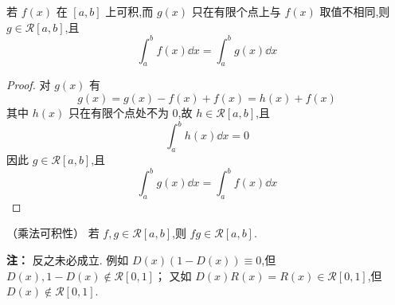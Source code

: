 \begin{corollary}
	若 $f(x)$ 在 $[a,b]$ 上可积,而 $g(x)$ 只在有限个点上与 $f(x)$ 取值不相同,则 $g \in \mathcal{R}[a,b]$,且
	\[
	\int_a^b f(x)\dd x = \int_a^b g(x)\dd x
	\]
\end{corollary}
\begin{proof}
	对 $g(x)$ 有
	\[
	g(x) = g(x) - f(x) + f(x) = h(x) + f(x)
	\]
	其中 $h(x)$ 只在有限个点处不为 $0$,故 $h \in \mathcal{R}[a,b]$,且
	\[
	\int_a^b h(x)\dd x = 0
	\]
	因此 $g \in \mathcal{R}[a,b]$,且
	\[
	\int_a^b g(x)\dd x = \int_a^b f(x)\dd x
	\]
\end{proof}
\begin{proposition}（乘法可积性）
	若 \( f,g \in \mathcal{R}[a,b] \),则 \( fg \in \mathcal{R}[a,b] \).
\end{proposition}
\textbf{注：} 反之未必成立.
例如 \( D(x)(1-D(x)) \equiv 0 \),但 \( D(x), 1-D(x) \notin \mathcal{R}[0,1] \)；
又如 \( D(x)R(x) = R(x) \in \mathcal{R}[0,1] \),但 \( D(x) \notin \mathcal{R}[0,1] \).

